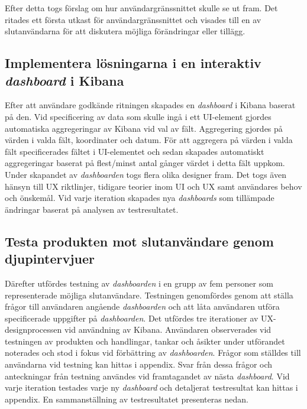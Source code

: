 \documentclass[12pt]{kththesis}
\begin{document}
Efter detta togs förslag om hur användargränssnittet skulle se ut fram. Det ritades ett första utkast för användargränssnittet och visades till en av slutanvändarna för att diskutera möjliga förändringar eller tillägg. 

\subsection{ Implementera lösningarna i en interaktiv \textit{dashboard} i Kibana }
Efter att användare godkände ritningen skapades en \textit{dashboard} i Kibana baserat på den. Vid specificering av data som skulle ingå i ett UI-element gjordes automatiska aggregeringar av Kibana vid val av fält. Aggregering gjordes på värden i valda fält, koordinater och datum. För att aggregera på värden i valda fält specificerades fältet i UI-elementet och sedan skapades automatiskt aggregeringar baserat på flest/minst antal gånger värdet i detta fält uppkom. Under skapandet av \textit{dashboarden} togs flera olika designer fram. Det togs även hänsyn till UX riktlinjer, tidigare teorier inom UI och UX samt användares behov och önskemål. Vid varje iteration skapades nya \textit{dashboards} som tillämpade ändringar baserat på analysen av testresultatet.

\subsection{ Testa produkten mot slutanvändare genom djupintervjuer 
}
Därefter utfördes testning av \textit{dashboarden} i en grupp av fem personer som representerade möjliga slutanvändare. Testningen genomfördes genom att ställa frågor till användaren angående \textit{dashboarden} och att låta användaren utföra specificerade uppgifter på \textit{dashboarden}. Det utfördes tre iterationer av UX-designprocessen vid användning av Kibana. Användaren observerades vid testningen av produkten och handlingar, tankar och åsikter under utförandet noterades och stod i fokus vid förbättring av \textit{dashboarden}. Frågor som ställdes till användarna vid testning kan hittas i appendix. Svar från dessa frågor och anteckningar från testning användes vid framtagandet av nästa \textit{dashboard}. Vid varje iteration testades varje ny \textit{dashboard} och detaljerat testresultat kan hittas i appendix. En sammanställning av testresultatet presenteras nedan. 
\end{document}
